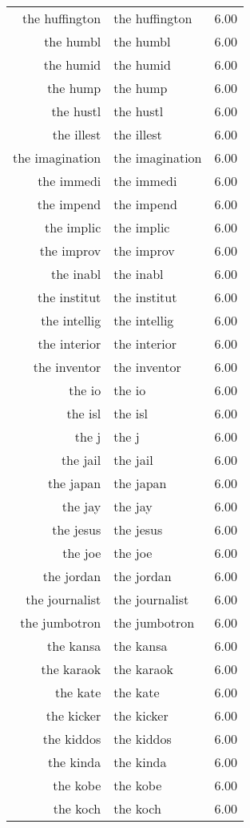 \begin{table}[ht]
\begin{tabular}{rlr}
  the huffington & the huffington & 6.00 \\ 
  the humbl & the humbl & 6.00 \\ 
  the humid & the humid & 6.00 \\ 
  the hump & the hump & 6.00 \\ 
  the hustl & the hustl & 6.00 \\ 
  the illest & the illest & 6.00 \\ 
  the imagination & the imagination & 6.00 \\ 
  the immedi & the immedi & 6.00 \\ 
  the impend & the impend & 6.00 \\ 
  the implic & the implic & 6.00 \\ 
  the improv & the improv & 6.00 \\ 
  the inabl & the inabl & 6.00 \\ 
  the institut & the institut & 6.00 \\ 
  the intellig & the intellig & 6.00 \\ 
  the interior & the interior & 6.00 \\ 
  the inventor & the inventor & 6.00 \\ 
  the io & the io & 6.00 \\ 
  the isl & the isl & 6.00 \\ 
  the j & the j & 6.00 \\ 
  the jail & the jail & 6.00 \\ 
  the japan & the japan & 6.00 \\ 
  the jay & the jay & 6.00 \\ 
  the jesus & the jesus & 6.00 \\ 
  the joe & the joe & 6.00 \\ 
  the jordan & the jordan & 6.00 \\ 
  the journalist & the journalist & 6.00 \\ 
  the jumbotron & the jumbotron & 6.00 \\ 
  the kansa & the kansa & 6.00 \\ 
  the karaok & the karaok & 6.00 \\ 
  the kate & the kate & 6.00 \\ 
  the kicker & the kicker & 6.00 \\ 
  the kiddos & the kiddos & 6.00 \\ 
  the kinda & the kinda & 6.00 \\ 
  the kobe & the kobe & 6.00 \\ 
  the koch & the koch & 6.00 \\ 

\end{tabular}
\end{table}
